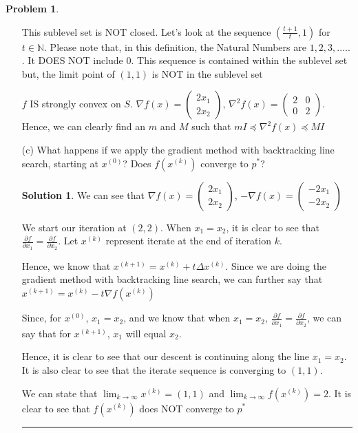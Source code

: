 \documentclass{article}
\theoremstyle{definition}
\newtheorem{problem}{Problem}
\def\fline{\rule{0.75\linewidth}{0.5pt}}
\newcommand{\finishline}{\begin{center}\fline\end{center}}
\newtheorem*{solution*}{Solution}
\newenvironment{solution}{\begin{solution*}}{{\finishline} \end{solution*}}
\begin{document}
\begin{problem}
\begin{enumerate}
    This sublevel set is NOT closed. Let's look at the sequence $(\frac{t + 1}{t}, 1)$ for $t \in \mathbb{N}$. Please note that, in this definition, the Natural Numbers are $1, 2, 3, .....$. It DOES NOT include 0.  This sequence is contained within the sublevel set but, the limit point of $(1, 1)$ is NOT in the sublevel set
    
    $f$ IS strongly convex on $S$. $\nabla f(x) = \begin{pmatrix}
2x_1 \\
2x_2
\end{pmatrix}$, $\nabla^2 f(x) = \begin{pmatrix}
2 & 0 \\
0 & 2
\end{pmatrix}$. Hence, we can clearly find an $m$ and $M$ such that $mI \preceq \nabla^2 f(x) \preceq MI$

    \item[(c)] What happens if we apply the gradient method with backtracking line search, starting at $x^{(0)}$? Does $f(x^{(k)})$ converge to $p^*$? 

    \begin{solution}
    We can see that $\nabla f(x) = \begin{pmatrix}
2x_1 \\
2x_2
\end{pmatrix}$, $-\nabla f(x) = \begin{pmatrix}
-2x_1 \\
-2x_2
\end{pmatrix}$

We start our iteration at $(2, 2)$. When $x_1 = x_2$, it is clear to see that $\frac{\partial{f}}{\partial{x_1}} = \frac{\partial{f}}{\partial{x_2}}$. Let $x^{(k)}$ represent iterate at the end of iteration $k$. 

Hence, we know that $x^{(k + 1)} = x^{(k)} + t \Delta x^{(k)}$. Since we are doing the gradient method with backtracking line search, we can further say that  $x^{(k + 1)} = x^{(k)} - t \nabla f(x^{(k)})$

Since, for $x^{(0)}$,  $x_1 = x_2$, and we know that when $x_1 = x_2$, $\frac{\partial{f}}{\partial{x_1}} = \frac{\partial{f}}{\partial{x_2}}$, we can say that for $x^{(k + 1)}$, $x_1$ will equal $x_2$. 

Hence, it is clear to see that our descent is continuing along the line $x_1 = x_2$. It is also clear to see that the iterate sequence is converging to $(1, 1)$.   

We can state that $\lim_{k \to \infty} x^{(k)} = (1, 1)$ and $\lim_{k \to \infty} f(x^{(k)}) = 2$. It is clear to see that $f(x^{(k)})$ does NOT converge to $p^*$
 
    \end{solution}
\end{enumerate}

    
\end{problem}
\end{document}
